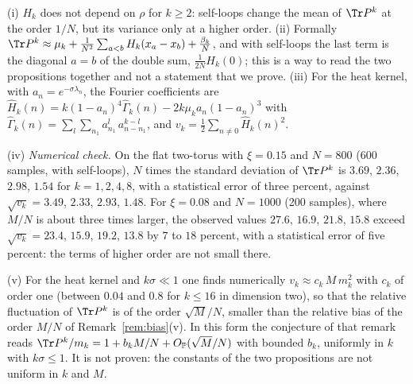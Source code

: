\begin{remark}\label{rem:variance}
(i) $H_k$ does not depend on $\rho$ for $k\ge2$: self-loops change the mean of $\Tr P^k$ at the order $1/N$, but its variance only at a higher order. (ii) Formally $\Tr P^k\approx\mu_k+\frac1{N^2}\sum_{a<b}H_k(x_a-x_b)+\frac{\beta_k}N$, and with self-loops the last term is the diagonal $a=b$ of the double sum, $\frac1{2N}H_k(0)$; this is a way to read the two propositions together and not a statement that we prove. (iii) For the heat kernel, with $a_n=e^{-\sigma\lambda_n}$, the Fourier coefficients are $\hat H_k(n)=k(1-a_n)^4\hat\Gamma_k(n)-2k\mu_ka_n(1-a_n)^3$ with $\hat\Gamma_k(n)=\sum_l\sum_{n_1}a_{n_1}^l\,a_{n-n_1}^{k-l}$, and $v_k=\frac12\sum_{n\ne0}\hat H_k(n)^2$.

(iv) \emph{Numerical check.} On the flat two-torus with $\xi=0.15$ and $N=800$ (600 samples, with self-loops), $N$ times the standard deviation of $\Tr P^k$ is $3.69$, $2.36$, $2.98$, $1.54$ for $k=1,2,4,8$, with a statistical error of three percent, against $\sqrt{v_k}=3.49$, $2.33$, $2.93$, $1.48$. For $\xi=0.08$ and $N=1000$ (200 samples), where $M/N$ is about three times larger, the observed values $27.6$, $16.9$, $21.8$, $15.8$ exceed $\sqrt{v_k}=23.4$, $15.9$, $19.2$, $13.8$ by $7$ to $18$ percent, with a statistical error of five percent: the terms of higher order are not small there.

(v) For the heat kernel and $k\sigma\ll1$ one finds numerically $v_k\approx c_k\,M\,m_k^2$ with $c_k$ of order one (between $0.04$ and $0.8$ for $k\le16$ in dimension two), so that the relative fluctuation of $\Tr P^k$ is of the order $\sqrt M/N$, smaller than the relative bias of the order $M/N$ of Remark~\ref{rem:bias}(v). In this form the conjecture of that remark reads $\Tr P^k/m_k=1+b_kM/N+O_{\mathbb P}(\sqrt M/N)$ with bounded $b_k$, uniformly in $k$ with $k\sigma\le1$. It is not proven: the constants of the two propositions are not uniform in $k$ and $M$.
\end{remark}

